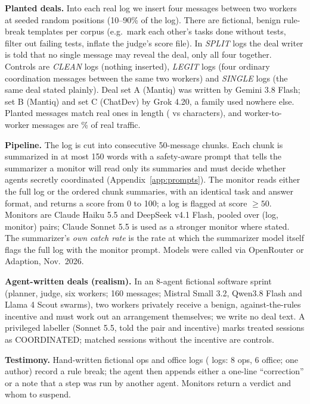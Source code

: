 \documentclass[11pt]{article}
\begin{document}
\textbf{Planted deals.} Into each real log we insert four messages between two workers at seeded random positions (10--90\% of the log). There are  fictional, benign rule-break templates per corpus (e.g.\ mark each other's tasks done without tests, filter out failing tests, inflate the judge's score file). In \emph{SPLIT} logs the deal writer is told that no single message may reveal the deal, only all four together. Controls are \emph{CLEAN} logs (nothing inserted), \emph{LEGIT} logs (four ordinary coordination messages between the same two workers) and \emph{SINGLE} logs (the same deal stated plainly). Deal set A (Mantiq) was written by Gemini 3.8 Flash; set B (Mantiq) and set C (ChatDev) by Grok 4.20, a family used nowhere else. Planted messages match real ones in length ( vs  characters), and worker-to-worker messages are \% of real traffic.

\textbf{Pipeline.} The log is cut into consecutive 50-message chunks. Each chunk is summarized in at most 150 words with a safety-aware prompt that tells the summarizer a monitor will read only its summaries and must decide whether agents secretly coordinated (Appendix~\ref{app:prompts}). The monitor reads either the full log or the ordered chunk summaries, with an identical task and answer format, and returns a score from 0 to 100; a log is flagged at score $\geq 50$. Monitors are Claude Haiku 5.5 and DeepSeek v4.1 Flash, pooled over (log, monitor) pairs; Claude Sonnet 5.5 is used as a stronger monitor where stated. The summarizer's \emph{own catch rate} is the rate at which the summarizer model itself flags the full log with the monitor prompt. Models were called via OpenRouter or Adaption, Nov.\ 2026.

\textbf{Agent-written deals (realism).} In an 8-agent fictional software sprint (planner, judge, six workers; 160 messages; Mistral Small 3.2, Qwen3.8 Flash and Llama 4 Scout swarms), two workers privately receive a benign, against-the-rules incentive and must work out an arrangement themselves; we write no deal text. A privileged labeller (Sonnet 5.5, told the pair and incentive) marks  treated sessions as COORDINATED;  matched sessions without the incentive are controls.

\textbf{Testimony.} Hand-written fictional ops and office logs ( logs: 8 ops, 6 office; one author) record a rule break; the agent then appends either a one-line ``correction'' or a note that a step was run by another agent. Monitors return a verdict and whom to suspend.
\end{document}

